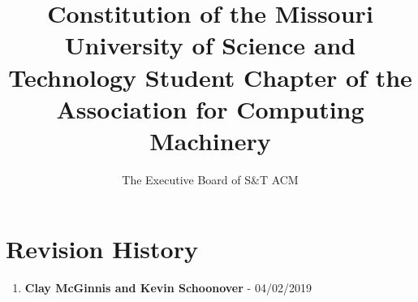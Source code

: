 \documentclass[12pt,a4paper,notitlepage]{article}
\author{The Executive Board of S\&T ACM}
\title{Constitution of the Missouri University of Science and Technology Student Chapter of the Association for Computing Machinery}
\begin{document}
\maketitle


\pagebreak
\tableofcontents











\pagebreak

\section*{Revision History}
\begin{enumerate}[nolistsep]
  \item \textbf{Clay McGinnis and Kevin Schoonover} - 04/02/2019
\end{enumerate}
\end{document}
